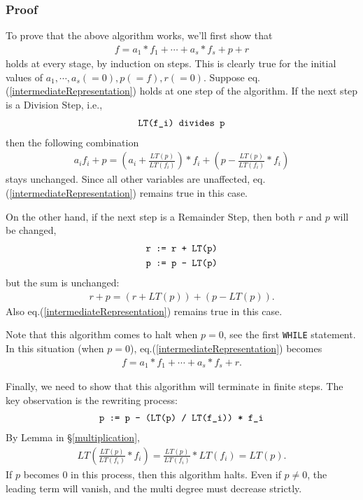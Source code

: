 \documentclass[11pt]{book}
\begin{document}
\subsubsection{Proof}
To prove that the above algorithm works, we'll first show that
\begin{eqnarray}
\label{intermediateRepresentation}
f = a_1*f_1 + \cdots + a_s * f_s + p + r
\end{eqnarray}
holds at every stage, by induction on steps.
This is clearly true for the initial values of $a_1, \cdots, a_s (= 0),p(=f),r(=0)$.
Suppose eq.(\ref{intermediateRepresentation}) holds at one step of the algorithm.
If the next step is a Division Step, i.e.,
\begin{eqnarray}
\verb|LT(f_i) divides p|
\end{eqnarray}
then the following combination
\begin{eqnarray}
a_i f_i + p = \left(a_i + \frac{LT(p)}{LT(f_i)} \right) * f_i + \left(p - \frac{LT(p)}{LT(f_i)}* f_i \right)
\end{eqnarray}
stays unchanged.
Since all other variables are unaffected, eq.(\ref{intermediateRepresentation}) remains true in this case.

On the other hand, if the next step is a Remainder Step, then both $r$ and $p$ will be changed, 
\begin{eqnarray}
\verb|r := r + LT(p)| \\
\verb|p := p - LT(p)|
\end{eqnarray}
but the sum is unchanged:
\begin{eqnarray}
r+p = \left(r + LT(p) \right) + \left( p - LT(p)\right).
\end{eqnarray}
Also eq.(\ref{intermediateRepresentation}) remains true in this case.

Note that this algorithm comes to halt when $p=0$, see the first \verb|WHILE| statement.
In this situation (when $p=0$), eq.(\ref{intermediateRepresentation}) becomes
\begin{eqnarray}
f = a_1*f_1 + \cdots + a_s * f_s + r.
\end{eqnarray}

Finally, we need to show that this algorithm will terminate in finite steps.
The key observation is the rewriting process:
\begin{eqnarray}
\verb| p := p - (LT(p) / LT(f_i)) * f_i |
\end{eqnarray}
By Lemma in \S\ref{multiplication},
\begin{eqnarray}
LT \left( \frac{LT(p)}{LT(f_i)} * f_i \right) = \frac{LT(p)}{LT(f_i)} * LT(f_i) = LT(p).
\end{eqnarray}
If $p$ becomes $0$ in this process, then this algorithm halts.
Even if $p \neq 0$, the leading term will vanish, and the multi degree must decrease strictly.
\end{document}
